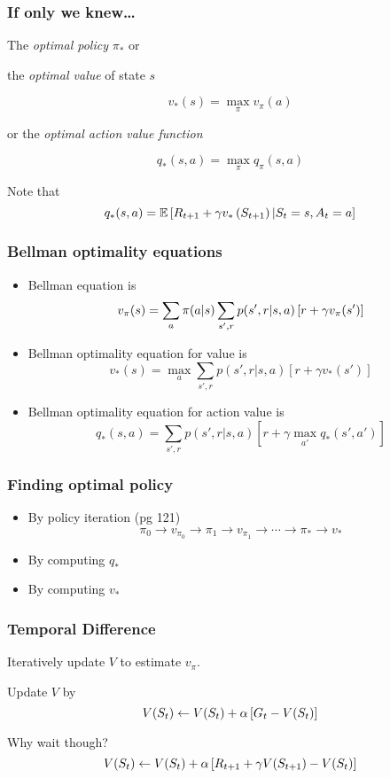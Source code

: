 \documentclass{beamer}
\begin{document}
\frame
{
   \frametitle{If only we knew\dots}
  
   The \textit{optimal policy} $\pi_*$ or
   
   the \textit{optimal value} of state $s$
   
   $$v_* (s) = \max_\pi v_\pi(a)$$
   
   or the \textit{optimal action value function}
   
   $$q_*(s, a) = \max_\pi q_\pi(s, a)$$
   
   Note that
   $$q_*(s, a) = \mathbb{E} \left[{R_{t+1} + \gamma v_* \left({S_{t+1}}\right) | S_t = s, A_t=a}\right]$$ 
}

\frame
{
   \frametitle{Bellman optimality equations}
   
   \begin{itemize}
      \item<1-> Bellman equation is 
      $$v_\pi(s) = \sum_a \pi(a|s) \sum_{s',r} p(s',r| s, a) \left[{r + \gamma v_\pi(s')}\right]$$
      
      \item<2-> Bellman optimality equation for value is
      $$v_*(s) = \max_a \sum_{s', r} p(s', r| s, a) [r + \gamma v_*(s')]$$
      
      \item<3-> Bellman optimality equation for action value is
      $$q_*(s,a) = \sum_{s', r} p(s', r| s, a) [r +  \gamma \max_{a'} q_*(s', a')]$$
      
   \end{itemize}
}

\frame
{
   \frametitle{Finding optimal policy}
   
   \begin{itemize}
      \item<1-> By policy iteration (pg 121)
      $$\pi_0 \to v_{\pi_0} \to \pi_1 \to v_{\pi_1} \to \cdots \to \pi_* \to v_*$$
      
      \item<2-> By computing $q_*$
      
      \item<3-> By computing $v_*$
      
   \end{itemize}
}

\frame
{
   \frametitle{Temporal Difference}
   Iteratively update $V$ to estimate $v_\pi$.   
   
   Update $V$ by
   $$V(S_t) \leftarrow V(S_t) + \alpha \left[{G_t - V(S_t)}\right]$$
   
   Why wait though?
   $$V(S_t) \leftarrow V(S_t) + \alpha \left[{R_{t+1} + \gamma V(S_{t+1}) - V(S_t)}\right]$$
}
\end{document}
